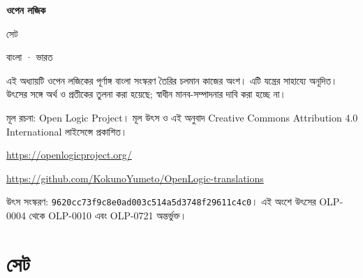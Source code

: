 \documentclass[11pt,a4paper,openany]{book}
\theoremstyle{definition}
\begin{document}
\begin{titlepage}
\vspace*{18mm}
{\Huge\bfseries ওপেন লজিক\par}
\vspace{7mm}
{\LARGE সেট\par}
\vspace{5mm}
{\large বাংলা · ভারত\par}
\vfill
এই অধ্যায়টি ওপেন লজিকের পূর্ণাঙ্গ বাংলা সংস্করণ তৈরির চলমান কাজের অংশ।
এটি যন্ত্রের সাহায্যে অনূদিত। উৎসের সঙ্গে অর্থ ও প্রতীকের তুলনা করা হয়েছে;
স্বাধীন মানব-সম্পাদনার দাবি করা হচ্ছে না।
\par
মূল রচনা: Open Logic Project। মূল উৎস ও এই অনুবাদ Creative Commons
Attribution 4.0 International লাইসেন্সে প্রকাশিত।
\par
\url{https://openlogicproject.org/}
\par
\url{https://github.com/KokunoYumeto/OpenLogic-translations}
\par
উৎস সংস্করণ: \texttt{9620cc73f9c8e0ad003c514a5d3748f29611c4c0}।
এই অংশে উৎসের OLP-0004 থেকে OLP-0010 এবং OLP-0721 অন্তর্ভুক্ত।
\end{titlepage}
\tableofcontents
\chapter{সেট}
\end{document}
